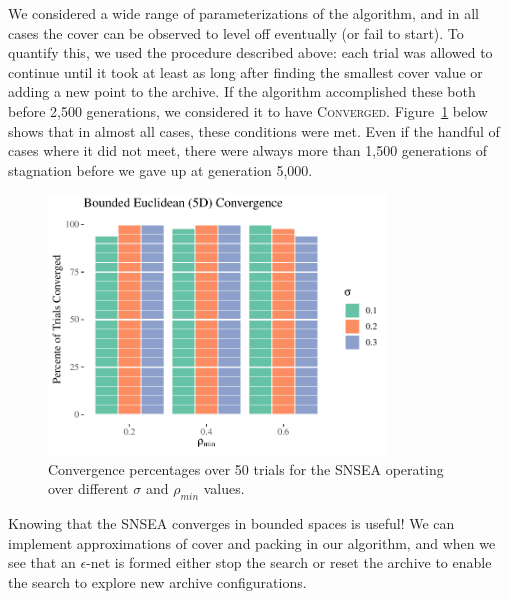 \documentclass[twoside]{article}
\begin{document}
We considered a wide range of parameterizations of the algorithm, and in all cases the cover can be observed to level off eventually (or fail to start).  To quantify this, we used the procedure described above:  each trial was allowed to continue until it took at least as long after finding the smallest cover value or adding a new point to the archive.  If the algorithm accomplished these both before 2,500 generations, we considered it to have \textsc{Converged}.  Figure~\ref{fig:bounded:nopop:conv} below shows that in almost all cases, these conditions were met.  Even if the handful of cases where it did not meet, there were always more than 1,500 generations of stagnation before we gave up at generation 5,000.  
%
\begin{figure}[t]
\includegraphics[width=0.8\textwidth]{Figures/bounded-conv-NOPOP.pdf}
\caption{\label{fig:bounded:nopop:conv} Convergence percentages over 50 trials for the SNSEA operating over different $\sigma$ and $\rho_{min}$ values.}
\end{figure}
%




Knowing that the SNSEA converges in bounded spaces is useful! We can implement approximations of cover and packing in our algorithm, and when we see that an $\epsilon$-net is formed either stop the search or reset the archive to enable the search to explore new archive configurations.  
\end{document}
